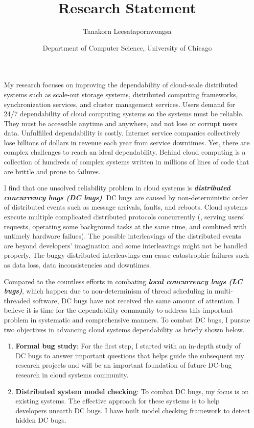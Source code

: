 \documentclass[11pt]{article}
\begin{document}
\title{Research Statement}
\author{Tanakorn Leesatapornwongsa}
\date{\vspace{-1ex} \small{Department of Computer Science, University of
Chicago}}

\maketitle

My research focuses on improving the dependability of cloud-scale distributed
systems such as scale-out storage systems, distributed computing frameworks,
synchronization services, and cluster management services. Users demand for
24/7 dependability of cloud computing systems so the systems must be reliable.
They must be accessible anytime and anywhere, and not lose or corrupt users
data. Unfulfilled dependability is costly. Internet service companies
collectively lose billions of dollars in revenue each year from service
downtimes. Yet, there are complex challenges to reach an ideal dependability.
Behind cloud computing is a collection of hundreds of complex systems written in
millions of lines of code that are brittle and prone to failures.

I find that one unsolved reliability problem in cloud systems is
\textbf{\textit{distributed concurrency bugs (DC bugs)}}. DC bugs are caused by
non-deterministic order of distributed events such as message arrivals, faults,
and reboots. Cloud systems execute multiple complicated distributed protocols
concurrently (\eg, serving users' requests, operating some background tasks at
the same time, and combined with untimely hardware failues). The possible
interleavings of the distributed events are beyond developers' imagination and
some interleavings might not be handled properly. The buggy
distributed interleavings can cause catastrophic failures such as data loss,
data inconsistencies and downtimes. 

Compared to the countless efforts in combating \textbf{\textit{local
concurrency bugs (LC bugs)}}, which happen due to non-determinism of thread
scheduling in multi-threaded software, DC bugs have not received the same
amount of attention. I believe it is time for the dependability community to
address this important problem in systematic and comprehensive manners. To
combat DC bugs, I pursue two objectives in advancing cloud systems dependability
as briefly shown below.

\begin{enumerate}

\item \textbf{Formal bug study}: For the first step, I started with an in-depth
study of DC bugs to answer important questions that helps guide the subsequent
my research projects and will be an important foundation of future DC-bug
research in cloud systems community.

\item \textbf{Distributed system model checking}: To combat DC bugs, my focus is
on existing systems. The effective approach for these systems is to help
developers unearth DC bugs. I have built model checking framework to detect
hidden DC bugs. 

\end{enumerate}
\end{document}
